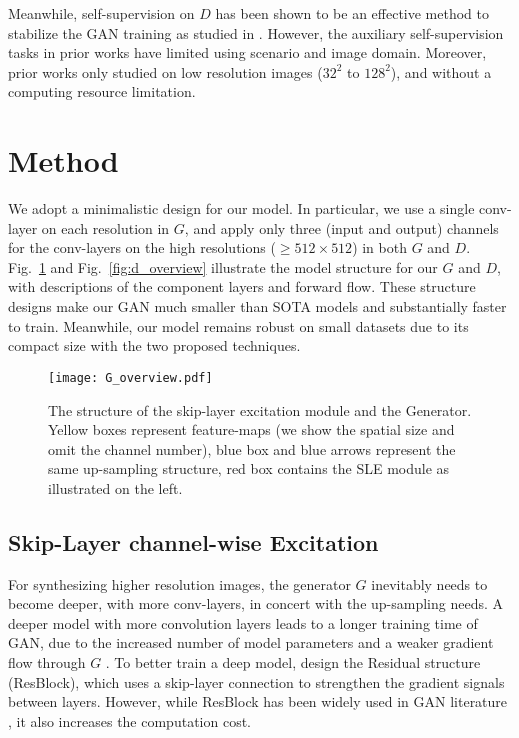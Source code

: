 \documentclass{article} \usepackage{iclr2021_conference,times}
\begin{document}
Meanwhile, self-supervision on $D$ has been shown to be an effective method to stabilize the GAN training as studied in \cite{tran2019self,chen2019self}. However, the auxiliary self-supervision tasks in prior works have limited using scenario and image domain. Moreover, prior works only studied on low resolution images ($32^2$ to $128^2$), and without a computing resource limitation.  

\section{Method}

We adopt a minimalistic design for our model. In particular, we use a single conv-layer on each resolution in $G$, and apply only three (input and output) channels for the conv-layers on the high resolutions ($\geq512\times512$) in both $G$ and $D$. 
Fig.~\ref{fig:g_overview} and Fig.~\ref{fig:d_overview}  illustrate the model structure for our $G$ and $D$, with descriptions of the component layers and forward flow. These structure designs make our GAN much smaller than SOTA models and substantially faster to train. Meanwhile, our model remains robust on small datasets due to its compact size with the two proposed techniques.


\begin{figure}[h]
\begin{center}
\texttt{[image: G\_overview.pdf]}
\end{center}
\caption{The structure of the skip-layer excitation module and the Generator. Yellow boxes represent feature-maps (we show the spatial size and omit the channel number), blue box and blue arrows represent the same up-sampling structure, red box contains the SLE module as illustrated on the left.}
\label{fig:g_overview}
\end{figure}


\subsection{Skip-Layer channel-wise Excitation}

For synthesizing higher resolution images, the generator $ G $ inevitably needs to become deeper, with more conv-layers, in concert with the up-sampling needs. A deeper model with more convolution layers leads to a longer training time of GAN, due to the increased number of model parameters and a weaker gradient flow through $G$ \citep{zhang2017stackgan,karras2017progressive,karnewar2019msg}. To better train a deep model, \citeauthor{he2016deep} design the Residual structure (ResBlock), which uses a skip-layer connection to strengthen the gradient signals between layers. However, while ResBlock has been widely used in GAN literature \citep{wang2018high,karras2020analyzing}, it also increases the computation cost. 
\end{document}
